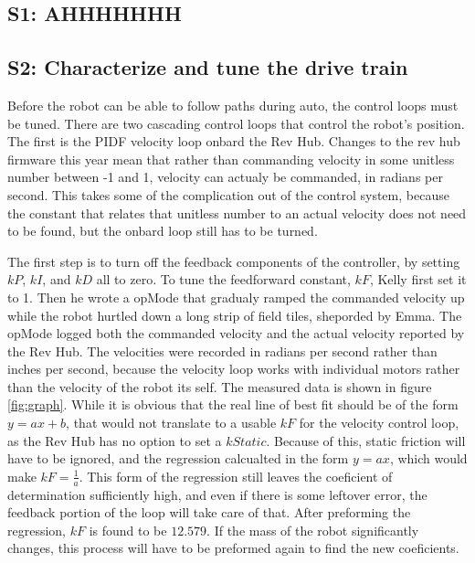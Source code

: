 \documentclass{article}
\begin{document}
\subsection{S1: AHHHHHHH}

\subsection{S2: Characterize and tune the drive train}


Before the robot can be able to follow paths during auto, the control loops must be tuned. There are two cascading control loops that control the robot's position. The first is the PIDF velocity loop onbard the Rev Hub. Changes to the rev hub firmware this year mean that rather than commanding velocity in some unitless number between -1 and 1, velocity can actualy be commanded, in radians per second. This takes some of the complication out of the control system, because the constant that relates that unitless number to an actual velocity does not need to be found, but the onbard loop still has to be turned. 

The first step is to turn off the feedback components of the controller, by setting $kP$, $kI$, and $kD$ all to zero. To tune the feedforward constant, $kF$, Kelly first set it to 1. Then he wrote a opMode that gradualy ramped the commanded velocity up while the robot hurtled down a long strip of field tiles, sheporded by Emma. The opMode logged both the commanded velocity and the actual velocity reported by the Rev Hub. The velocities were recorded in radians per second rather than inches per second, because the velocity loop works with individual motors rather than the velocity of the robot its self. The measured data is shown in figure \ref{fig:graph}. While it is obvious that the real line of best fit should be of the form $y=ax+b$, that would not translate to a usable $kF$ for the velocity control loop, as the Rev Hub has no option to set a $kStatic$. Because of this, static friction will have to be ignored, and the regression calcualted in the form $y=ax$, which would make $kF = \frac{1}{a}$. This form of the regression still leaves the coeficient of determination sufficiently high, and even if there is some leftover error, the feedback portion of the loop will take care of that. After preforming the regression, $kF$ is found to be $12.579$. If the mass of the robot significantly changes, this process will have to be preformed again to find the new coeficients.
\end{document}
